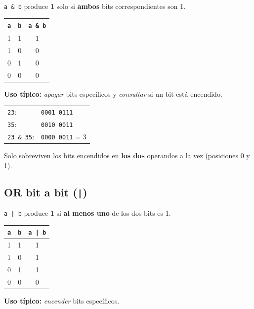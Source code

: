 \documentclass[12pt, oneside]{article}
\begin{document}
\texttt{a \& b} produce \textbf{1} solo si \textbf{ambos} bits
correspondientes son 1.

\begin{center}
\begin{tabular}{ccc}
  \toprule
  \texttt{a} & \texttt{b} & \texttt{a \& b} \\
  \midrule
  1 & 1 & 1 \\
  1 & 0 & 0 \\
  0 & 1 & 0 \\
  0 & 0 & 0 \\
  \bottomrule
\end{tabular}
\end{center}

\textbf{Uso típico:} \textit{apagar} bits específicos y \textit{consultar}
si un bit está encendido.

\begin{ejemplo}[\texttt{23 \& 35 = 3}]
\begin{center}
\begin{tabular}{ll}
  \texttt{23}:       & \texttt{0001 0111} \\
  \texttt{35}:       & \texttt{0010 0011} \\
  \texttt{23 \& 35}: & \texttt{0000 0011} = 3 \\
\end{tabular}
\end{center}
Solo sobreviven los bits encendidos en \textbf{los dos} operandos a la vez
(posiciones 0 y 1).
\end{ejemplo}

\subsection{OR bit a bit (\texttt{|})}

\texttt{a | b} produce \textbf{1} si \textbf{al menos uno} de los dos bits
es 1.

\begin{center}
\begin{tabular}{ccc}
  \toprule
  \texttt{a} & \texttt{b} & \texttt{a | b} \\
  \midrule
  1 & 1 & 1 \\
  1 & 0 & 1 \\
  0 & 1 & 1 \\
  0 & 0 & 0 \\
  \bottomrule
\end{tabular}
\end{center}

\textbf{Uso típico:} \textit{encender} bits específicos.
\end{document}
